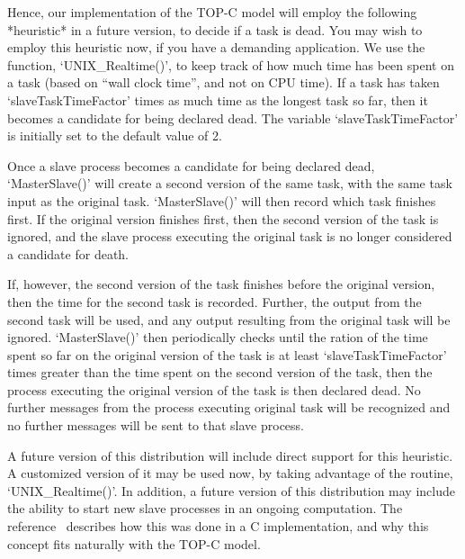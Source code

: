 Hence, our implementation of the TOP-C model will  employ  the  following
*heuristic* in a future version, to decide if a task  is  dead.  You  may
wish to employ this heuristic now, if you have a  demanding  application.
We use the {\ParGAP} function, `UNIX_Realtime()', to keep  track  of  how
much time has been spent on a task (based on ``wall clock time'', and not
on CPU time). If a task has taken  `slaveTaskTimeFactor'  times  as  much
time as the longest task so far, then it becomes a  candidate  for  being
declared dead. The {\GAP} variable `slaveTaskTimeFactor' is initially set
to the default value of 2.

Once a slave  process  becomes  a  candidate  for  being  declared  dead,
`MasterSlave()' will create a second version of the same task,  with  the
same task input as the original task. `MasterSlave()'  will  then  record
which task finishes first. If the original version finishes  first,  then
the second version  of  the  task  is  ignored,  and  the  slave  process
executing the original task is  no  longer  considered  a  candidate  for
death.

If, however, the second version of the task finishes before the  original
version, then the time for the second  task  is  recorded.  Further,  the
output from the second task will be used, and any output  resulting  from
the original task will  be  ignored.  `MasterSlave()'  then  periodically
checks until the ration of the time spent so far on the original  version
of the task is at least `slaveTaskTimeFactor' times greater than the time
spent on the second version of the task, then the process  executing  the
original version of the task is then declared dead. No  further  messages
from the process executing  original  task  will  be  recognized  and  no
further messages will be sent to that slave process.

A future version of this distribution will  include  direct  support  for
this heuristic. A customized version of it may be  used  now,  by  taking
advantage of the {\ParGAP} routine,  `UNIX_Realtime()'.  In  addition,  a
future version of this distribution may include the ability to start  new
slave processes in  an  ongoing  computation.  The  reference~\cite{CG98}
describes how this was done in a C implementation, and why  this  concept
fits naturally with the TOP-C model.

